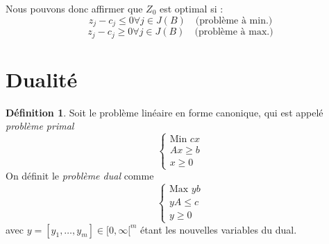 \documentclass[a4paper]{report}
\theoremstyle{definition}
\newtheorem*{definition}{Définition}
\theoremstyle{remark}
\theoremstyle{plain}
\begin{document}
Nous pouvons donc affirmer que $Z_0$ est optimal si :
\[z_j - c_j \leq 0 \forall j \in J(B) \quad \text{(problème à min.)}\]
\[z_j - c_j \geq 0 \forall j \in J(B) \quad \text{(problème à max.)}\]

\section{Dualité}
\begin{definition}
Soit le problème linéaire en forme canonique, qui est appelé \emph{problème primal}
\[\begin{cases}
\text{Min } cx \\
Ax\ge b \\
x \ge 0
\end{cases}\]
On définit le \emph{problème dual} comme
\[\begin{cases}
\text{Max } yb\\
yA\le c\\
y\ge 0
\end{cases}\]
avec \(y=[y_1,\dots,y_m]\in[0,\infty[^m\)
étant les nouvelles variables du dual.
\end{definition}
\end{document}
